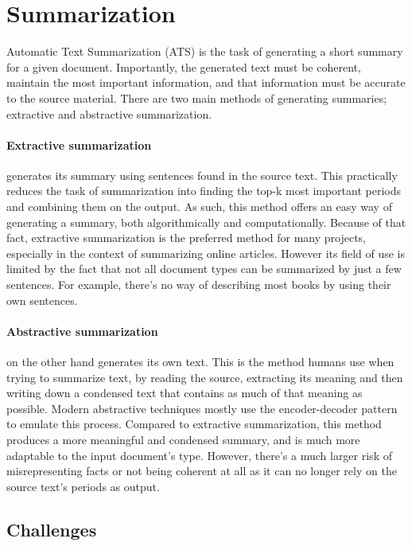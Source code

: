 \documentclass{article}
\begin{document}
	
	\section{Summarization}
	
	Automatic Text Summarization (ATS) is the task of generating a short summary for a given document. Importantly, the generated text must be coherent, maintain the most important information, and that information must be accurate to the source material. There are two main methods of generating summaries; extractive and abstractive summarization. \par
	
	\paragraph{Extractive summarization} generates its summary using sentences found in the source text. This practically reduces the task of summarization into finding the top-k most important periods and combining them on the output. As such, this method offers an easy way of generating a summary, both algorithmically and computationally. Because of that fact, extractive summarization is the preferred method for many projects, especially in the context of summarizing online articles. However its field of use is limited by the fact that not all document types can be summarized by just a few sentences. For example, there's no way of describing most books by using their own sentences.
	
	\paragraph{Abstractive summarization} on the other hand generates its own text. This is the method humans use when trying to summarize text, by reading the source, extracting its meaning and then writing down a condensed text that contains as much of that meaning as possible. Modern abstractive techniques mostly use the encoder-decoder pattern to emulate this process. Compared to extractive summarization, this method produces a more meaningful and condensed summary, and is much more adaptable to the input document's type. However, there's a much larger risk of misrepresenting facts or not being coherent at all as it can no longer rely on the source text's periods as output.
	
	
	\subsection{Challenges}
	
\end{document}
